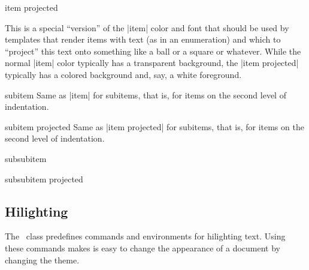 \begin{element}{item projected}\no\yes\yes

  This is a special ``version'' of the |item| color and font that
  should be used by templates that render items with text (as in an
  enumeration) and which to ``project'' this text onto something like
  a ball or a square or whatever. While the normal |item| color
  typically has a transparent background, the |item projected|
  typically has a colored background and, say, a white foreground.
\end{element}

\begin{element}{subitem}\no\yes\yes
  Same as |item| for subitems, that is, for items on the second level of
  indentation.
\end{element}

\begin{element}{subitem projected}\no\yes\yes
  Same as |item projected| for subitems, that is, for items on the
  second level of indentation.
\end{element}

\begin{element}{subsubitem}\no\yes\yes
\end{element}

\begin{element}{subsubitem projected}\no\yes\yes
\end{element}




\subsection{Hilighting}

The \beamer\ class predefines commands and environments for
hilighting text. Using these commands makes is easy to change the
appearance of a document by changing the theme.


